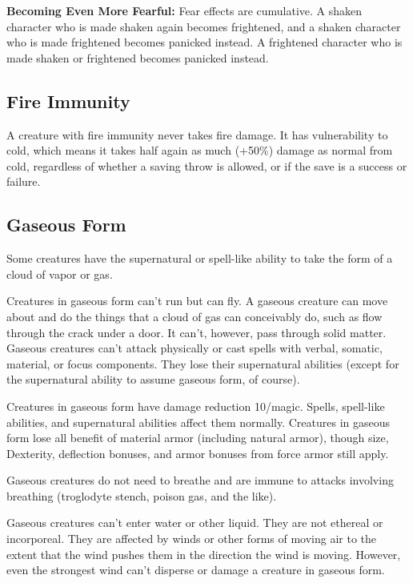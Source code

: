 \textbf{Becoming Even More Fearful:} Fear effects are cumulative. A shaken character 
who is made shaken again becomes frightened, and a shaken character who is made 
frightened becomes panicked instead. A frightened character who is made shaken 
or frightened becomes panicked instead.

\subsection{Fire Immunity}

A creature with fire immunity never takes fire damage. It has vulnerability to 
cold, which means it takes half again as much (+50\%) damage as normal from cold, 
regardless of whether a saving throw is allowed, or if the save is a success or 
failure.

\subsection{Gaseous Form}

Some creatures have the supernatural or spell-like ability to take the form of 
a cloud of vapor or gas.

Creatures in gaseous form can't run but can fly. A gaseous creature can move about 
and do the things that a cloud of gas can conceivably do, such as flow through 
the crack under a door. It can't, however, pass through solid matter. Gaseous creatures 
can't attack physically or cast spells with verbal, somatic, material, or focus 
components. They lose their supernatural abilities (except for the supernatural 
ability to assume gaseous form, of course).

Creatures in gaseous form have damage reduction 10/magic. Spells, spell-like abilities, 
and supernatural abilities affect them normally. Creatures in gaseous form lose 
all benefit of material armor (including natural armor), though size, Dexterity, 
deflection bonuses, and armor bonuses from force armor still apply.

Gaseous creatures do not need to breathe and are immune to attacks involving breathing 
(troglodyte stench, poison gas, and the like).

Gaseous creatures can't enter water or other liquid. They are not ethereal or incorporeal. 
They are affected by winds or other forms of moving air to the extent that the 
wind pushes them in the direction the wind is moving. However, even the strongest 
wind can't disperse or damage a creature in gaseous form.

